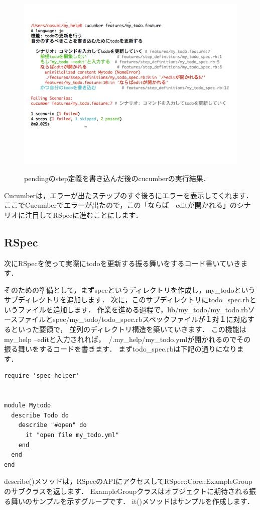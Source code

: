\begin{figure}[htbp]\begin{center}
\includegraphics[width=12cm,bb= 0 0 937 753]{../figs/./cucumber03.001.jpg}
\caption{pendingのstep定義を書き込んだ後のcucumberの実行結果．}
\label{fig:cucumber03}
\label{default}\end{center}\end{figure}
Cucumberは，エラーが出たステップのすぐ後ろにエラーを表示してくれます．
ここでCucumberでエラーが出たので，この「ならば　editが開かれる」のシナリオに注目してRSpecに進むことにします．

\subsection{RSpec}
次にRSpecを使って実際にtodoを更新する振る舞いをするコード書いていきます．

そのための準備として，まずspecというディレクトリを作成し，my\_todoというサブディレクトリを追加します．
次に，このサブディレクトリにtodo\_spec.rbというファイルを追加します．
作業を進める過程で，lib/my\_todo/my\_todo.rbソースファイルとspec/my\_todo/todo\_spec.rbスペックファイルが１対１に対応するといった要領で，
並列のディレクトリ構造を築いていきます．
この機能はmy\_help --editと入力されれば，~/.my\_help/my\_todo.ymlが開かれるのでその振る舞いをするコードを書きます．
まずtodo\_spec.rbは下記の通りになります．
\begin{lstlisting}[style=customRuby,basicstyle={\scriptsize\ttfamily}]
require 'spec_helper'


module Mytodo
  describe Todo do
    describe "#open" do
      it "open file my_todo.yml" 
    end
  end
end

\end{lstlisting}
describe()メソッドは，RSpecのAPIにアクセスしてRSpec::Core::ExampleGroupのサブクラスを返します．
ExampleGroupクラスはオブジェクトに期待される振る舞いのサンプルを示すグループです．
it()メソッドはサンプルを作成します．

